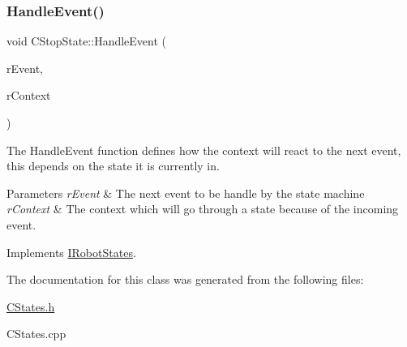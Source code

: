 \subsubsection{\texorpdfstring{Handle\+Event()}{HandleEvent()}}
{\footnotesize\ttfamily void C\+Stop\+State\+::\+Handle\+Event (\begin{DoxyParamCaption}\item[{\hyperlink{classCEvent}{C\+Event} \&}]{r\+Event,  }\item[{\hyperlink{classCRobotContext}{C\+Robot\+Context} \&}]{r\+Context }\end{DoxyParamCaption})\hspace{0.3cm}{\ttfamily [virtual]}}



The Handle\+Event function defines how the context will react to the next event, this depends on the state it is currently in. 


\begin{DoxyParams}{Parameters}
{\em r\+Event} & The next event to be handle by the state machine \\
\hline
{\em r\+Context} & The context which will go through a state because of the incoming event. \\
\hline
\end{DoxyParams}


Implements \hyperlink{classIRobotStates_a0b6c28a3deed04f93371a9395022f1ed}{I\+Robot\+States}.



The documentation for this class was generated from the following files\+:\begin{DoxyCompactItemize}
\item 
\hyperlink{CStates_8h}{C\+States.\+h}\item 
C\+States.\+cpp\end{DoxyCompactItemize}
